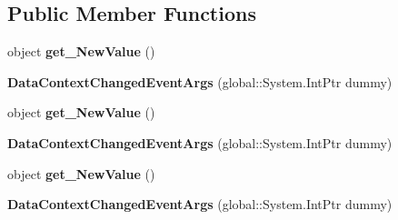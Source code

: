 \subsection*{Public Member Functions}
\begin{DoxyCompactItemize}
\item 
\mbox{\label{class_windows_1_1_u_i_1_1_xaml_1_1_data_context_changed_event_args_abc7396314016ed96c604c129e1c28432}} 
object {\bfseries get\+\_\+\+New\+Value} ()
\item 
\mbox{\label{class_windows_1_1_u_i_1_1_xaml_1_1_data_context_changed_event_args_a403b12e99c603462d56be7948d8056d5}} 
{\bfseries Data\+Context\+Changed\+Event\+Args} (global\+::\+System.\+Int\+Ptr dummy)
\item 
\mbox{\label{class_windows_1_1_u_i_1_1_xaml_1_1_data_context_changed_event_args_abc7396314016ed96c604c129e1c28432}} 
object {\bfseries get\+\_\+\+New\+Value} ()
\item 
\mbox{\label{class_windows_1_1_u_i_1_1_xaml_1_1_data_context_changed_event_args_a403b12e99c603462d56be7948d8056d5}} 
{\bfseries Data\+Context\+Changed\+Event\+Args} (global\+::\+System.\+Int\+Ptr dummy)
\item 
\mbox{\label{class_windows_1_1_u_i_1_1_xaml_1_1_data_context_changed_event_args_abc7396314016ed96c604c129e1c28432}} 
object {\bfseries get\+\_\+\+New\+Value} ()
\item 
\mbox{\label{class_windows_1_1_u_i_1_1_xaml_1_1_data_context_changed_event_args_a403b12e99c603462d56be7948d8056d5}} 
{\bfseries Data\+Context\+Changed\+Event\+Args} (global\+::\+System.\+Int\+Ptr dummy)
\item 
\mbox{\label{class_windows_1_1_u_i_1_1_xaml_1_1_data_context_changed_event_args_abc7396314016ed96c604c129e1c28432}} 

\end{DoxyCompactItemize}
